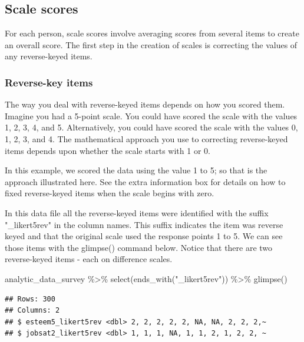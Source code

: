 \documentclass[
]{krantz}
\makeatletter
\newenvironment{Shaded}{\begin{snugshade}}{\end{snugshade}}
\newcommand{\FunctionTok}[1]{\textcolor[rgb]{0,0,0}{#1}}
\newcommand{\NormalTok}[1]{#1}
\newcommand{\SpecialCharTok}[1]{\textcolor[rgb]{0,0,0}{#1}}
\newcommand{\StringTok}[1]{\textcolor[rgb]{0.5,0.5,0.5}{#1}}
\newenvironment{kframe}{%
\medskip{}
\setlength{\fboxsep}{.8em}
 \def\at@end@of@kframe{}%
 \ifinner\ifhmode%
  \def\at@end@of@kframe{\end{minipage}}%
  \begin{minipage}{\columnwidth}%
 \fi\fi%
 \def\FrameCommand##1{\hskip\@totalleftmargin \hskip-\fboxsep
 \colorbox{shadecolor}{##1}\hskip-\fboxsep
     \hskip-\linewidth \hskip-\@totalleftmargin \hskip\columnwidth}%
 \MakeFramed {\advance\hsize-\width
   \@totalleftmargin\z@ \linewidth\hsize
   \@setminipage}}%
 {\par\unskip\endMakeFramed%
 \at@end@of@kframe}
\renewenvironment{Shaded}{\begin{kframe}}{\end{kframe}}
\makeatother
\begin{document}
\hypertarget{scale-scores}{%
\subsection{Scale scores}\label{scale-scores}}

For each person, scale scores involve averaging scores from several items to create an overall score. The first step in the creation of scales is correcting the values of any reverse-keyed items.

\hypertarget{reverse-key-items}{%
\subsubsection{Reverse-key items}\label{reverse-key-items}}

The way you deal with reverse-keyed items depends on how you scored them. Imagine you had a 5-point scale. You could have scored the scale with the values 1, 2, 3, 4, and 5. Alternatively, you could have scored the scale with the values 0, 1, 2, 3, and 4. The mathematical approach you use to correcting reverse-keyed items depends upon whether the scale starts with 1 or 0.

In this example, we scored the data using the value 1 to 5; so that is the approach illustrated here. See the extra information box for details on how to fixed reverse-keyed items when the scale begins with zero.

In this data file all the reverse-keyed items were identified with the suffix "\_likert5rev" in the column names. This suffix indicates the item was reverse keyed and that the original scale used the response points 1 to 5. We can see those items with the glimpse() command below. Notice that there are two reverse-keyed items - each on difference scales.

\begin{Shaded}
\begin{Highlighting}[]
\NormalTok{analytic\_data\_survey }\SpecialCharTok{\%\textgreater{}\%}
  \FunctionTok{select}\NormalTok{(}\FunctionTok{ends\_with}\NormalTok{(}\StringTok{"\_likert5rev"}\NormalTok{)) }\SpecialCharTok{\%\textgreater{}\%}
  \FunctionTok{glimpse}\NormalTok{()}
\end{Highlighting}
\end{Shaded}

\begin{verbatim}
## Rows: 300
## Columns: 2
## $ esteem5_likert5rev <dbl> 2, 2, 2, 2, 2, NA, NA, 2, 2, 2,~
## $ jobsat2_likert5rev <dbl> 1, 1, 1, NA, 1, 1, 2, 1, 2, 2, ~
\end{verbatim}
\end{document}

